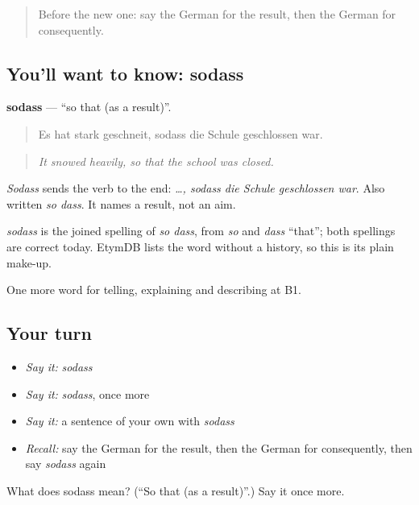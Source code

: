 \begin{quote}
Before the new one: say the German for the result, then the German for consequently.
\end{quote}

\subsection*{You'll want to know: sodass}
\textbf{sodass} — \textquotedblleft{}so that (as a result)\textquotedblright{}.

\begin{quote}
Es hat stark geschneit, sodass die Schule geschlossen war.
\end{quote}

\begin{quote}
\emph{It snowed heavily, so that the school was closed.}
\end{quote}

\emph{Sodass} sends the verb to the end: \emph{…, sodass die Schule geschlossen war}. Also written \emph{so dass}. It names a result, not an aim.

\begin{cousinweb}
\emph{sodass} is the joined spelling of \emph{so dass}, from \emph{so} and \emph{dass} \textquotedblleft{}that\textquotedblright{}; both spellings are correct today. EtymDB lists the word without a history, so this is its plain make-up.
\end{cousinweb}

\begin{grammarlens}[title={What you've built}]
One more word for telling, explaining and describing at B1.
\end{grammarlens}

\subsection*{Your turn}
\begin{itemize}
\raggedright
  \item \emph{Say it:} \emph{sodass}
  \item \emph{Say it:} \emph{sodass}, once more
  \item \emph{Say it:} a sentence of your own with \emph{sodass}
  \item \emph{Recall:} say the German for the result, then the German for consequently, then say \emph{sodass} again
\end{itemize}

\begin{tcolorbox}[breakable,colback=teal!4,colframe=teal!35!black,title={Before you move on}]
What does sodass mean? (\textquotedblleft{}So that (as a result)\textquotedblright{}.) Say it once more.
\end{tcolorbox}
